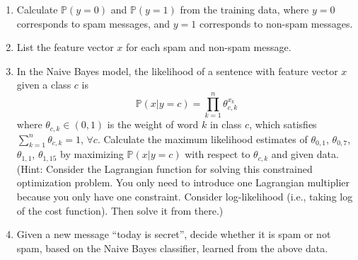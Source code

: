 \documentclass[twoside,10pt]{article}
\begin{document}
\begin{enumerate}
\begin{enumerate}
\item Calculate $\mathbb P(y = 0)$ and $\mathbb P(y = 1)$ from the training data, where $y = 0$ corresponds to spam messages, and $y = 1$ corresponds to non-spam messages.
\item List the feature vector $x$ for each spam and non-spam message.
\item In the Naive Bayes model, the likelihood of a sentence with feature vector $x$ given a class $c$ is
\[
\mathbb P (x|y = c) = \prod_{k=1}^n \theta_{c, k}^{x_k}
\]
where $\theta_{c,k} \in (0, 1)$ is the weight of word $k$ in class $c$, which satisfies $\sum_{k=1}^n \theta_{c, k} = 1$, $\forall c$. Calculate the maximum likelihood estimates of $\theta_{0,1}$, $\theta_{0,7}$, $\theta_{1,1}$, $\theta_{1,15}$ by maximizing $\mathbb P (x|y = c)$ with respect to $\theta_{c, k}$ and given data. (Hint: Consider the Lagrangian function for solving this constrained optimization problem. You only need to introduce one Lagrangian multiplier because you only have one constraint. Consider log-likelihood (i.e., taking log of the cost function). Then solve it from there.)
\item Given a new message ``\textsf{today is secret}'', decide whether it is spam or not spam, based on the Naive
Bayes classifier, learned from the above data.

\end{enumerate}


\end{enumerate}
\end{document}
